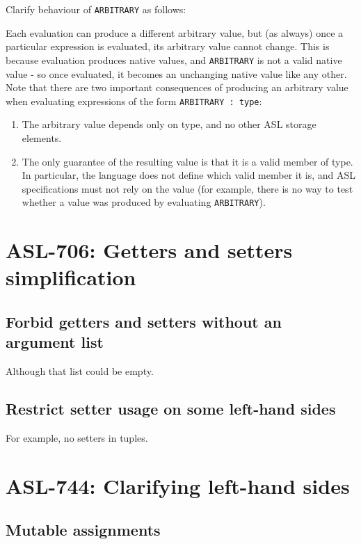 Clarify behaviour of \texttt{ARBITRARY} as follows:

Each evaluation can produce a different arbitrary value, but (as always)
once a particular expression is evaluated, its arbitrary value cannot
change. This is because evaluation produces native values, and
\texttt{ARBITRARY} is not a valid native value - so once evaluated, it
becomes an unchanging native value like any other.  Note that there are
two important consequences of producing an arbitrary value when
evaluating expressions of the form \texttt{ARBITRARY : type}:
\begin{enumerate}
\item The arbitrary value depends only on type, and no other ASL storage
elements.

\item The only guarantee of the resulting value is that it is a valid member of
type. In particular, the language does not define which valid member it
is, and ASL specifications must not rely on the value (for example, there
is no way to test whether a value was produced by evaluating
\texttt{ARBITRARY}).
\end{enumerate}

\section{ASL-706: Getters and setters simplification}

\subsection{Forbid getters and setters without an argument list}

Although that list could be empty.

\subsection{Restrict setter usage on some left-hand sides} 

For example, no setters in tuples.

\section{ASL-744: Clarifying left-hand sides}

\subsection{Mutable assignments}

